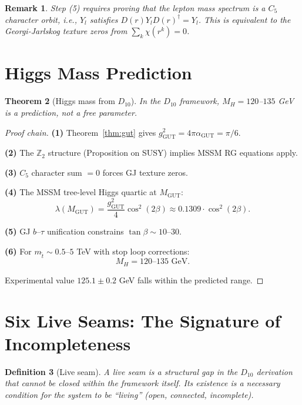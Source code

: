 \documentclass[11pt,a4paper]{article}
\newtheorem{theorem}{Theorem}
\newtheorem{definition}[theorem]{Definition}
\newtheorem{remark}[theorem]{Remark}
\begin{document}
\begin{remark}
Step (5) requires proving that the lepton mass spectrum is a $C_5$ character orbit, i.e., $Y_l$ satisfies $D(r)Y_lD(r)^\dagger = Y_l$. This is equivalent to the Georgi-Jarlskog texture zeros from $\sum_k \chi(r^k) = 0$.
\end{remark}

\section{Higgs Mass Prediction}
\label{sec:higgs}

\begin{theorem}[Higgs mass from $D_{10}$]
\label{thm:higgs}
In the $D_{10}$ framework, $M_H = 120$--$135$ GeV is a prediction, not a free parameter.
\end{theorem}

\begin{proof}[Proof chain]
\textbf{(1)} Theorem~\ref{thm:gut} gives $g_{\text{GUT}}^2 = 4\pi\alpha_{\text{GUT}} = \pi/6$.

\textbf{(2)} The $\mathbb{Z}_2$ structure (Proposition on SUSY) implies MSSM RG equations apply.

\textbf{(3)} $C_5$ character sum $= 0$ forces GJ texture zeros.

\textbf{(4)} The MSSM tree-level Higgs quartic at $M_{\text{GUT}}$:
\[
\lambda(M_{\text{GUT}}) = \frac{g_{\text{GUT}}^2}{4}\cos^2(2\beta) \approx 0.1309 \cdot \cos^2(2\beta).
\]

\textbf{(5)} GJ $b$--$\tau$ unification constrains $\tan\beta \sim 10$--$30$.

\textbf{(6)} For $m_{\tilde{t}} \sim 0.5$--$5$ TeV with stop loop corrections:
\[
M_H = 120\text{--}135 \text{ GeV}.
\]

Experimental value $125.1 \pm 0.2$ GeV falls within the predicted range.
\end{proof}

\section{Six Live Seams: The Signature of Incompleteness}
\label{sec:seams}

\begin{definition}[Live seam]
A live seam is a structural gap in the $D_{10}$ derivation that cannot be closed within the framework itself. Its existence is a necessary condition for the system to be ``living'' (open, connected, incomplete).
\end{definition}
\end{document}
